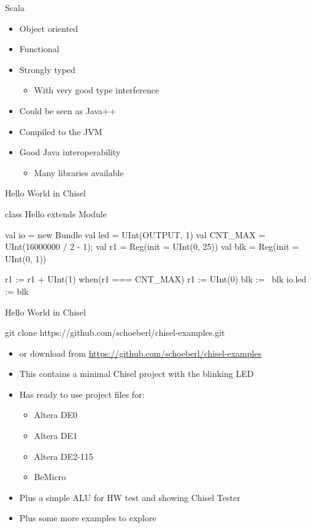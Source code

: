 \documentclass[xcolor=pdflatex,dvipsnames,table]{beamer}
\begin{document}
\begin{frame}[fragile]{Scala}
\begin{itemize}
\item Object oriented
\item Functional
\item Strongly typed
\begin{itemize}
\item With very good type interference
\end{itemize}
\item Could be seen as Java++
\item Compiled to the JVM
\item Good Java interoperability
\begin{itemize}
\item Many libraries available
\end{itemize}
\end{itemize}
\end{frame}


\begin{frame}[fragile]{Hello World in Chisel}
\begin{chisel}
class Hello extends Module {
  val io = new Bundle {
    val led = UInt(OUTPUT, 1)
  }
  val CNT_MAX = UInt(16000000 / 2 - 1);
  val r1 = Reg(init = UInt(0, 25))
  val blk = Reg(init = UInt(0, 1))

  r1 := r1 + UInt(1)
  when(r1 === CNT_MAX) {
    r1 := UInt(0)
    blk := ~blk
  }
  io.led := blk
}
\end{chisel}
\end{frame}

\begin{frame}[fragile]{Hello World in Chisel}
\begin{chisel}
git clone https://github.com/schoeberl/chisel-examples.git
\end{chisel}
\begin{itemize}
\item or download from \url{https://github.com/schoeberl/chisel-examples}
\item This contains a minimal Chisel project with the blinking LED
\item Has ready to use project files for:
\begin{itemize}
\item Altera DE0
\item Altera DE1
\item Altera DE2-115
\item BeMicro
\end{itemize}
\item Plus a simple ALU for HW test and showing Chisel Tester
\item Plus some more examples to explore
\end{itemize}
\end{frame}
\end{document}
